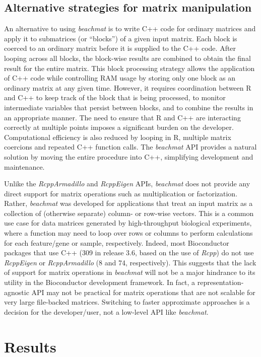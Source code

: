 \documentclass[10pt,letterpaper]{article}
\newcommand{\beachmat}{\textit{beachmat}}
\begin{document}
\subsection*{Alternative strategies for matrix manipulation}
An alternative to using \beachmat{} is to write C++ code for ordinary matrices and apply it to submatrices (or ``blocks'') of a given input matrix.
Each block is coerced to an ordinary matrix before it is supplied to the C++ code.
After looping across all blocks, the block-wise results are combined to obtain the final result for the entire matrix.
This block processing strategy allows the application of C++ code while controlling RAM usage by storing only one block as an ordinary matrix at any given time.
However, it requires coordination between R and C++ to keep track of the block that is being processed, to monitor intermediate variables that persist between blocks, and to combine the results in an appropriate manner.
The need to ensure that R and C++ are interacting correctly at multiple points imposes a significant burden on the developer.
Computational efficiency is also reduced by looping in R, multiple matrix coercions and repeated C++ function calls.
The \beachmat{} API provides a natural solution by moving the entire procedure into C++, simplifying development and maintenance.

Unlike the \textit{RcppArmadillo} and \textit{RcppEigen} APIs, \beachmat{} does not provide any direct support for matrix operations such as multiplication or factorization.
Rather, \beachmat{} was developed for applications that treat an input matrix as a collection of (otherwise separate) column- or row-wise vectors.
This is a common use case for data matrices generated by high-throughput biological experiments, where a function may need to loop over rows or columns to perform calculations for each feature/gene or sample, respectively.
Indeed, most Bioconductor packages that use C++ (309 in release 3.6, based on the use of \textit{Rcpp}) do not use \textit{RcppEigen} or \textit{RcppArmadillo} (8 and 74, respectively).
This suggests that the lack of support for matrix operations in \beachmat{} will not be a major hindrance to its utility in the Bioconductor development framework.
In fact, a representation-agnostic API may not be practical for matrix operations that are not scalable for very large file-backed matrices.
Switching to faster approximate approaches is a decision for the developer/user, not a low-level API like \beachmat{}.

\section*{Results}
\end{document}
